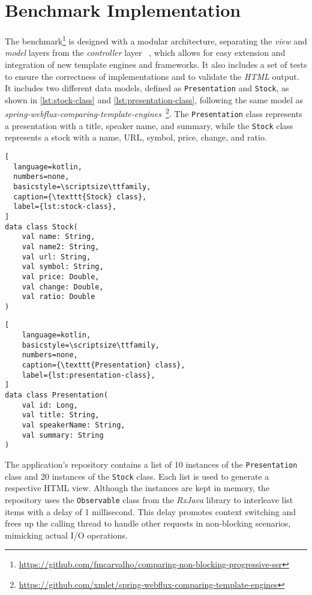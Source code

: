 \section{Benchmark Implementation}
\label{sec:bench}

The benchmark\footnote{\url{https://github.com/fmcarvalho/comparing-non-blocking-progressive-ssr}}
is designed with a modular architecture, separating the \textit{view} and
\textit{model} layers from the \textit{controller} layer ~\cite{Bucanek2009},
which allows for easy extension and integration of new template engines and
frameworks. It also includes a set of tests to ensure the correctness of
implementations and to validate the \textit{HTML} output. It includes two
different data models, defined as \texttt{Presentation} and \texttt{Stock}, as
shown in \autoref{lst:stock-class} and \autoref{lst:presentation-class},
following the same model as
\textit{spring-webflux-comparing-template-engines}~\footnote{\url{https://github.com/xmlet/spring-webflux-comparing-template-engines}}.
The \texttt{Presentation} class represents a presentation with a title, speaker
name, and summary, while the \texttt{Stock} class represents a stock with a
name, URL, symbol, price, change, and ratio.

\begin{center}
      \begin{minipage}{0.48\textwidth}
            \begin{lstlisting}[
  language=kotlin,
  numbers=none,
  basicstyle=\scriptsize\ttfamily,
  caption={\texttt{Stock} class},
  label={lst:stock-class},
]
data class Stock(
    val name: String,
    val name2: String,
    val url: String,
    val symbol: String,
    val price: Double, 
    val change: Double, 
    val ratio: Double
)
\end{lstlisting}
\end{minipage}
\hfill
\begin{minipage}{0.48\textwidth}
  \begin{lstlisting}[
    language=kotlin,
    basicstyle=\scriptsize\ttfamily,
    numbers=none,
    caption={\texttt{Presentation} class},
    label={lst:presentation-class},
]
data class Presentation(
    val id: Long,
    val title: String, 
    val speakerName: String,
    val summary: String
)
\end{lstlisting}
\end{minipage}
\end{center}

The application's repository contains a list of 10 instances of the
\texttt{Presentation} class and 20 instances of the \texttt{Stock} class. Each
list is used to generate a respective HTML view. Although the instances are
kept in memory, the repository uses the \texttt{Observable} class from the
\textit{RxJava} library to interleave list items with a delay of 1 millisecond.
This delay promotes context switching and frees up the calling thread to handle
other requests in non-blocking scenarios, mimicking actual I/O operations.

